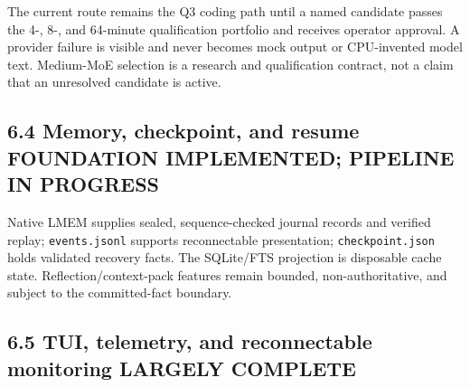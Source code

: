 \documentclass[11pt,a4paper]{article}
\newcommand{\pathcode}[1]{\texttt{#1}}
\newcommand{\role}[2]{\textcolor{#1}{\textbf{#2}}}
\begin{document}
The current route remains the Q3 coding path until a named candidate passes the
4-, 8-, and 64-minute qualification portfolio and receives operator approval.
A provider failure is visible and never becomes mock output or CPU-invented
model text. Medium-MoE selection is a research and qualification contract, not
a claim that an unresolved candidate is active.

\subsection*{6.4 Memory, checkpoint, and resume \hfill \role{leafblue}{FOUNDATION IMPLEMENTED; PIPELINE IN PROGRESS}}

\begin{center}
\end{center}

Native LMEM supplies sealed, sequence-checked journal records and verified
replay; \pathcode{events.jsonl} supports reconnectable presentation;
\pathcode{checkpoint.json} holds validated recovery facts. The SQLite/FTS
projection is disposable cache state. Reflection/context-pack features remain
bounded, non-authoritative, and subject to the committed-fact boundary.

\subsection*{6.5 TUI, telemetry, and reconnectable monitoring \hfill \role{leafgreen}{LARGELY COMPLETE}}
\end{document}
